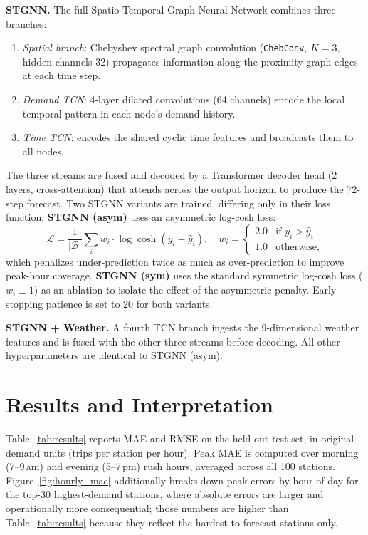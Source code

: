 \documentclass[12pt]{article}
\begin{document}
\textbf{STGNN.}
The full Spatio-Temporal Graph Neural Network combines three branches:
\begin{enumerate}
  \item \textit{Spatial branch}: Chebyshev spectral graph convolution
        (\texttt{ChebConv}, $K=3$, hidden channels 32) propagates information along the
        proximity graph edges at each time step.
  \item \textit{Demand TCN}: 4-layer dilated convolutions (64 channels) encode the local
        temporal pattern in each node's demand history.
  \item \textit{Time TCN}: encodes the shared cyclic time features and broadcasts
        them to all nodes.
\end{enumerate}
The three streams are fused and decoded by a Transformer decoder head
(2 layers, cross-attention) that attends across the output horizon to produce the 72-step
forecast. Two STGNN variants are trained, differing only in their loss function.
\textbf{STGNN (asym)} uses an asymmetric log-cosh loss:
\[
  \mathcal{L} = \frac{1}{|\mathcal{B}|}
    \sum_{i} w_i \cdot \log\cosh(y_i - \hat{y}_i), \quad
  w_i = \begin{cases} 2.0 & \text{if } y_i > \hat{y}_i \\ 1.0 & \text{otherwise,} \end{cases}
\]
which penalizes under-prediction twice as much as over-prediction to improve peak-hour
coverage. \textbf{STGNN (sym)} uses the standard symmetric log-cosh loss ($w_i \equiv 1$)
as an ablation to isolate the effect of the asymmetric penalty.
Early stopping patience is set to 20 for both variants.

\textbf{STGNN + Weather.}
A fourth TCN branch ingests the 9-dimensional weather features and is fused with the
other three streams before decoding. All other hyperparameters are identical to STGNN (asym).

\section{Results and Interpretation}

Table~\ref{tab:results} reports MAE and RMSE on the held-out test set, in original
demand units (trips per station per hour). Peak MAE is computed over morning
(7--9\,am) and evening (5--7\,pm) rush hours, averaged across all 100 stations.
Figure~\ref{fig:hourly_mae} additionally breaks down peak errors by hour of day
for the top-30 highest-demand stations, where absolute errors are larger and
operationally more consequential; those numbers are higher than Table~\ref{tab:results}
because they reflect the hardest-to-forecast stations only.
\end{document}
